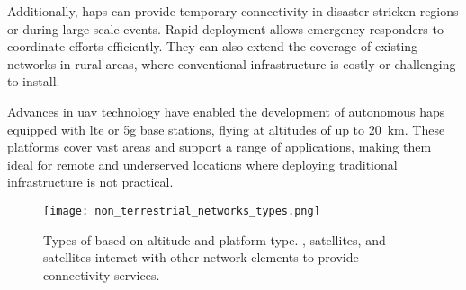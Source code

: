 Additionally, \glspl{hap} can provide temporary connectivity in disaster-stricken regions or during large-scale events. Rapid deployment allows emergency responders to coordinate efforts efficiently. They can also extend the coverage of existing networks in rural areas, where conventional infrastructure is costly or challenging to install.

Advances in \gls{uav} technology have enabled the development of autonomous \glspl{hap} equipped with \gls{lte} or \gls{5g} base stations, flying at altitudes of up to \SI{20}{\kilo\meter}. These platforms cover vast areas and support a range of applications, making them ideal for remote and underserved locations where deploying traditional infrastructure is not practical.

\begin{figure}
  \texttt{[image: non\_terrestrial\_networks\_types.png]}
  \caption{Types of  based on altitude and platform type. ,  satellites, and  satellites interact with other network elements to provide connectivity services. \autocite{alertifyAirbusNTT}}
  \label{fig:ntn_types}
\end{figure}
